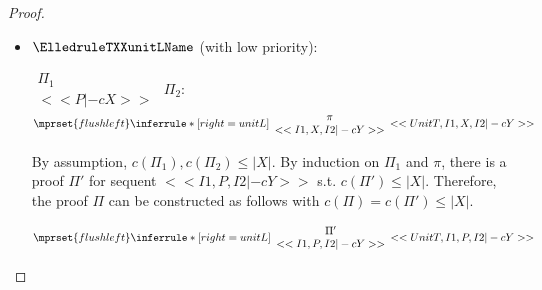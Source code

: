 \begin{proof}
\begin{enumerate}
  \begin{itemize}
  \item $\ElledruleTXXunitLName$ (with low priority):
    \begin{center}
      \scriptsize
      \begin{math}
        \begin{array}{c}
          \Pi_1 \\
          {<<P |-c X>>}
        \end{array}
      \end{math}
      \qquad\qquad
      $\Pi_2$:
      \begin{math}
        $$\mprset{flushleft}
        \inferrule* [right={\tiny unitL}] {
          {
            \begin{array}{c}
              \pi \\
              {<<I1, X, I2 |-c Y>>}
            \end{array}
          }
        }{<<UnitT, I1, X, I2 |-c Y>>}
      \end{math}
    \end{center}
    By assumption, $c(\Pi_1),c(\Pi_2)\leq |X|$. By induction on $\Pi_1$ and $\pi$, there is a
    proof $\Pi'$ for sequent $<<I1, P, I2 |-c Y>>$ s.t. $c(\Pi') \leq |X|$. Therefore, the
    proof $\Pi$ can be constructed as follows with $c(\Pi) = c(\Pi') \leq |X|$.
    \begin{center}
      \scriptsize
      \begin{math}
        $$\mprset{flushleft}
        \inferrule* [right={\tiny unitL}] {
          {
            \begin{array}{c}
              \Pi' \\
              {<<I1, P, I2 |-c Y>>}
            \end{array}
          }
        }{<<UnitT, I1, P, I2 |-c Y>>}
      \end{math}
    \end{center}


\end{itemize}
\end{enumerate}
\end{proof}
